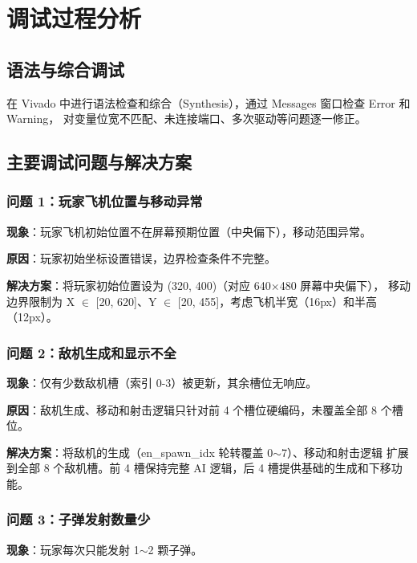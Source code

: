 \documentclass[12pt,a4paper]{ctexart}
\begin{document}
\section{调试过程分析}

\subsection{语法与综合调试}

在 Vivado 中进行语法检查和综合（Synthesis），通过 Messages 窗口检查 Error 和 Warning，
对变量位宽不匹配、未连接端口、多次驱动等问题逐一修正。


\subsection{主要调试问题与解决方案}

\subsubsection{问题 1：玩家飞机位置与移动异常}

\textbf{现象}：玩家飞机初始位置不在屏幕预期位置（中央偏下），移动范围异常。

\textbf{原因}：玩家初始坐标设置错误，边界检查条件不完整。

\textbf{解决方案}：将玩家初始位置设为 (320, 400)（对应 640$\times$480 屏幕中央偏下），
移动边界限制为 X $\in$ [20, 620]、Y $\in$ [20, 455]，考虑飞机半宽（16px）和半高（12px）。

\subsubsection{问题 2：敌机生成和显示不全}

\textbf{现象}：仅有少数敌机槽（索引 0-3）被更新，其余槽位无响应。

\textbf{原因}：敌机生成、移动和射击逻辑只针对前 4 个槽位硬编码，未覆盖全部 8 个槽位。

\textbf{解决方案}：将敌机的生成（en\_spawn\_idx 轮转覆盖 0$\sim$7）、移动和射击逻辑
扩展到全部 8 个敌机槽。前 4 槽保持完整 AI 逻辑，后 4 槽提供基础的生成和下移功能。

\subsubsection{问题 3：子弹发射数量少}

\textbf{现象}：玩家每次只能发射 1$\sim$2 颗子弹。
\end{document}
